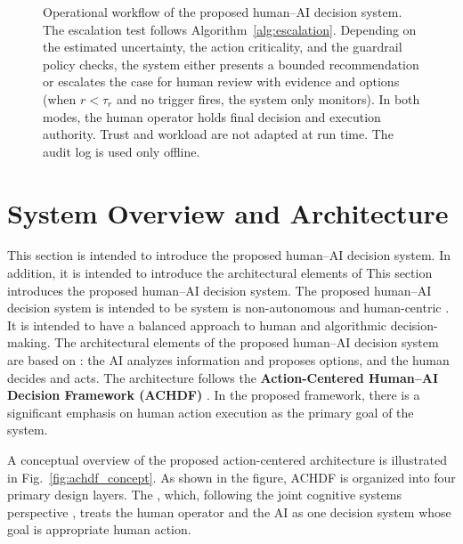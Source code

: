 \documentclass[journal]{IEEEtran}
\theoremstyle{plain}
\theoremstyle{definition}
\providecommand{\DIFaddtex}[1]{{\protect\color{blue} \sf #1}} %
\providecommand{\DIFdeltex}[1]{{\protect\color{red} \scriptsize #1}} %
\providecommand{\DIFaddbegin}{} %
\providecommand{\DIFaddend}{} %
\providecommand{\DIFdelbegin}{} %
\providecommand{\DIFdelend}{} %
\providecommand{\DIFadd}[1]{\texorpdfstring{\DIFaddtex{#1}}{#1}} %
\providecommand{\DIFdel}[1]{\texorpdfstring{\DIFdeltex{#1}}{}} %
\newcommand{\DIFscaledelfig}{0.5}
\newlength{\DIFdelgraphicswidth} %
\newlength{\DIFdelgraphicsheight} %
\newcommand{\DIFaddincludegraphics}[2][]{{\color{blue}\fbox{\DIFOincludegraphics[#1]{#2}}}} %
\newcommand{\DIFdelincludegraphics}[2][]{%
\sbox{\DIFdelgraphicsbox}{\DIFOincludegraphics[#1]{#2}}%
\settoboxwidth{\DIFdelgraphicswidth}{\DIFdelgraphicsbox} %
\settoboxtotalheight{\DIFdelgraphicsheight}{\DIFdelgraphicsbox} %
\scalebox{\DIFscaledelfig}{%
\parbox[b]{\DIFdelgraphicswidth}{\usebox{\DIFdelgraphicsbox}\\[-\baselineskip] \rule{\DIFdelgraphicswidth}{0em}}\llap{\resizebox{\DIFdelgraphicswidth}{\DIFdelgraphicsheight}{%
\setlength{\unitlength}{\DIFdelgraphicswidth}%
\begin{picture}(1,1)%
\thicklines\linethickness{2pt} %
{\color[rgb]{1,0,0}\put(0,0){\framebox(1,1){}}}%
{\color[rgb]{1,0,0}\put(0,0){\line( 1,1){1}}}%
{\color[rgb]{1,0,0}\put(0,1){\line(1,-1){1}}}%
\end{picture}%
}\hspace*{3pt}}} %
} %
\DeclareRobustCommand{\DIFaddbegin}{\DIFOaddbegin \let\includegraphics\DIFaddincludegraphics} %
\DeclareRobustCommand{\DIFaddend}{\DIFOaddend \let\includegraphics\DIFOincludegraphics} %
\DeclareRobustCommand{\DIFdelbegin}{\DIFOdelbegin \let\includegraphics\DIFdelincludegraphics} %
\DeclareRobustCommand{\DIFdelend}{\DIFOaddend \let\includegraphics\DIFOincludegraphics} %
\begin{document}
\begin{figure}[t]
        \caption{Operational workflow of the proposed human--AI decision system.
The escalation test follows Algorithm~\ref{alg:escalation}. Depending on the estimated uncertainty, the action criticality, and the guardrail policy checks, the system either presents a bounded recommendation or escalates the case for human review with evidence and options (when $r < \tau_r$ and no trigger fires, the system only monitors). In both modes, the human operator holds final decision and execution authority. Trust and workload are not adapted at run time. The audit log is used only offline.}
        \label{fig:system_overview}
    \end{figure}
\DIFaddend 

    \section{System Overview and Architecture}
    \DIFdelbegin \DIFdel{This section is intended to introduce the proposed human--AI decision system. In addition, it is intended to introduce the architectural elements of }\DIFdelend \DIFaddbegin \label{sec:system}
    \DIFadd{This section introduces }\DIFaddend the proposed human--AI decision system. The \DIFdelbegin \DIFdel{proposed human--AI decision system is intended to be }\DIFdelend \DIFaddbegin \DIFadd{system is }\DIFaddend non-autonomous and human-centric\DIFdelbegin \DIFdel{. It is intended to have a balanced approach to human and algorithmic decision-making. The architectural elements of the proposed human--AI decision system are based on }\DIFdelend \DIFaddbegin \DIFadd{: the AI analyzes information and proposes options, and the human decides and acts. The architecture follows }\DIFaddend the \textbf{Action-Centered Human--AI Decision Framework (ACHDF)}\DIFdelbegin \DIFdel{. In the proposed framework, there is a significant emphasis on human action execution as the primary goal of the system.
}%

\DIFdel{A conceptual overview of the proposed action-centered architecture is illustrated in Fig.~\ref{fig:achdf_concept}.
As shown in the figure, ACHDF is organized into four primary design layers. The }\DIFdelend \DIFaddbegin \DIFadd{, which, following the joint cognitive systems perspective \cite{Hollnagel2005JCS,Woods2006JCS}, treats the human operator and the AI as one decision system whose goal is appropriate human action.
}
\end{document}
